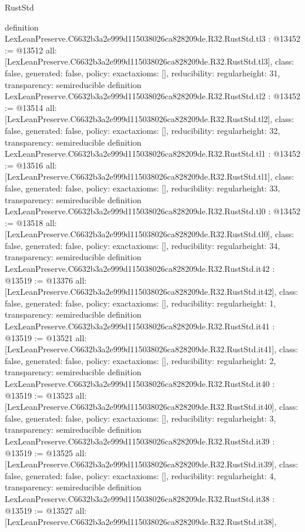 \begin{lexlean}{RustStd}
\begin{coremodule}
{}
definition LexLeanPreserve.C6632b3a2e999d115038026ca828209de.R32.RustStd.tl3 : @13452 := @13512 {
  all: [LexLeanPreserve.C6632b3a2e999d115038026ca828209de.R32.RustStd.tl3],
  class: false,
  generated: false,
  policy: exact{axioms: []},
  reducibility: regular{height: 31},
  transparency: semireducible
}
definition LexLeanPreserve.C6632b3a2e999d115038026ca828209de.R32.RustStd.tl2 : @13452 := @13514 {
  all: [LexLeanPreserve.C6632b3a2e999d115038026ca828209de.R32.RustStd.tl2],
  class: false,
  generated: false,
  policy: exact{axioms: []},
  reducibility: regular{height: 32},
  transparency: semireducible
}
definition LexLeanPreserve.C6632b3a2e999d115038026ca828209de.R32.RustStd.tl1 : @13452 := @13516 {
  all: [LexLeanPreserve.C6632b3a2e999d115038026ca828209de.R32.RustStd.tl1],
  class: false,
  generated: false,
  policy: exact{axioms: []},
  reducibility: regular{height: 33},
  transparency: semireducible
}
definition LexLeanPreserve.C6632b3a2e999d115038026ca828209de.R32.RustStd.tl0 : @13452 := @13518 {
  all: [LexLeanPreserve.C6632b3a2e999d115038026ca828209de.R32.RustStd.tl0],
  class: false,
  generated: false,
  policy: exact{axioms: []},
  reducibility: regular{height: 34},
  transparency: semireducible
}
definition LexLeanPreserve.C6632b3a2e999d115038026ca828209de.R32.RustStd.it42 : @13519 := @13376 {
  all: [LexLeanPreserve.C6632b3a2e999d115038026ca828209de.R32.RustStd.it42],
  class: false,
  generated: false,
  policy: exact{axioms: []},
  reducibility: regular{height: 1},
  transparency: semireducible
}
definition LexLeanPreserve.C6632b3a2e999d115038026ca828209de.R32.RustStd.it41 : @13519 := @13521 {
  all: [LexLeanPreserve.C6632b3a2e999d115038026ca828209de.R32.RustStd.it41],
  class: false,
  generated: false,
  policy: exact{axioms: []},
  reducibility: regular{height: 2},
  transparency: semireducible
}
definition LexLeanPreserve.C6632b3a2e999d115038026ca828209de.R32.RustStd.it40 : @13519 := @13523 {
  all: [LexLeanPreserve.C6632b3a2e999d115038026ca828209de.R32.RustStd.it40],
  class: false,
  generated: false,
  policy: exact{axioms: []},
  reducibility: regular{height: 3},
  transparency: semireducible
}
definition LexLeanPreserve.C6632b3a2e999d115038026ca828209de.R32.RustStd.it39 : @13519 := @13525 {
  all: [LexLeanPreserve.C6632b3a2e999d115038026ca828209de.R32.RustStd.it39],
  class: false,
  generated: false,
  policy: exact{axioms: []},
  reducibility: regular{height: 4},
  transparency: semireducible
}
definition LexLeanPreserve.C6632b3a2e999d115038026ca828209de.R32.RustStd.it38 : @13519 := @13527 {
  all: [LexLeanPreserve.C6632b3a2e999d115038026ca828209de.R32.RustStd.it38],
}
\end{coremodule}
\end{lexlean}
